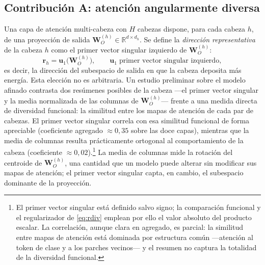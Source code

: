 \documentclass[11pt,a4paper]{article}
\theoremstyle{plain}
\newcommand{\Rset}{\mathbb{R}}
\begin{document}
\subsection{Contribución A: atención angularmente diversa}
\label{sec:metA}

Una capa de atención multi-cabeza con $H$ cabezas dispone, para cada
cabeza $h$, de una proyección de salida
$\bm{W}_O^{(h)}\in\Rset^{d\times d_h}$. Se define la \emph{dirección
representativa} de la cabeza $h$ como el primer vector singular
izquierdo de $\bm{W}_O^{(h)}$:
\begin{equation}
\bm{r}_h = \bm{u}_1\!\big(\bm{W}_O^{(h)}\big),
\qquad
\bm{u}_1 \;\text{primer vector singular izquierdo},
\label{eq:headdir}
\end{equation}
es decir, la dirección del subespacio de salida en que la cabeza
deposita más energía. Esta elección no es arbitraria. Un estudio
preliminar sobre el modelo afinado contrasta dos resúmenes posibles de
la cabeza ---el primer vector singular y la media normalizada de las
columnas de $\bm{W}_O^{(h)}$--- frente a una medida directa de
diversidad funcional: la similitud entre los mapas de atención de cada
par de cabezas. El primer vector singular correla con esa similitud
funcional de forma apreciable (coeficiente agregado $\approx0{,}35$
sobre las doce capas), mientras que la media de columnas resulta
prácticamente ortogonal al comportamiento de la cabeza (coeficiente
$\approx0{,}02$).\footnote{El primer vector singular está definido
salvo signo; la comparación funcional y el regularizador de
\cref{eq:rdiv} emplean por ello el valor absoluto del producto
escalar. La correlación, aunque clara en agregado, es parcial: la
similitud entre mapas de atención está dominada por estructura común
---atención al token de clase y a los parches vecinos--- y el resumen
no captura la totalidad de la diversidad funcional.} La media de
columnas mide la rotación del centroide de $\bm{W}_O^{(h)}$, una
cantidad que un modelo puede alterar sin modificar sus mapas de
atención; el primer vector singular capta, en cambio, el subespacio
dominante de la proyección.
\end{document}

